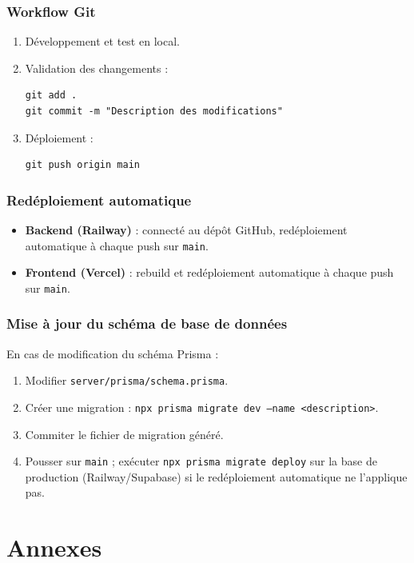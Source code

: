 \documentclass[12pt,a4paper]{report}
\begin{document}
\subsection*{Workflow Git}
\begin{enumerate}[leftmargin=*]
    \item Développement et test en local.
    \item Validation des changements :
\begin{lstlisting}
git add .
git commit -m "Description des modifications"
\end{lstlisting}
    \item Déploiement :
\begin{lstlisting}
git push origin main
\end{lstlisting}
\end{enumerate}
 
\subsection*{Redéploiement automatique}
\begin{itemize}[leftmargin=*]
    \item \textbf{Backend (Railway)} : connecté au dépôt GitHub, redéploiement automatique à chaque push sur \texttt{main}.
    \item \textbf{Frontend (Vercel)} : rebuild et redéploiement automatique à chaque push sur \texttt{main}.
\end{itemize}
 
\subsection*{Mise à jour du schéma de base de données}
En cas de modification du schéma Prisma :
\begin{enumerate}
    \item Modifier \texttt{server/prisma/schema.prisma}.
    \item Créer une migration : \texttt{npx prisma migrate dev --name <description>}.
    \item Commiter le fichier de migration généré.
    \item Pousser sur \texttt{main} ; exécuter \texttt{npx prisma migrate deploy} sur la base de production (Railway/Supabase) si le redéploiement automatique ne l'applique pas.
\end{enumerate}
 
\chapter{Annexes}
 
\end{document}

